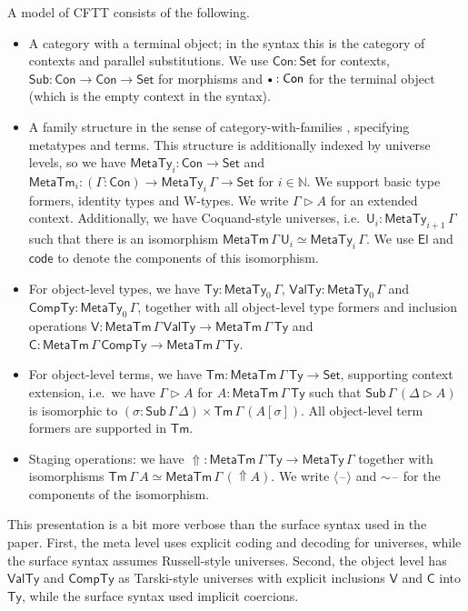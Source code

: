 \documentclass[acmsmall]{acmart}
\newcommand{\msf}[1]{{\mathsf{#1}}}
\newcommand{\mbb}[1]{\mathbb{#1}}
\newcommand{\U}{\mathsf{U}}
\newcommand{\code}{\mathsf{code}}
\newcommand{\bs}[1]{\boldsymbol{#1}}
\newcommand{\emptycon}{\scaleobj{.75}\bullet}
\newcommand{\El}{\msf{El}}
\newcommand{\Set}{\msf{Set}}
\newcommand{\Con}{\msf{Con}}
\newcommand{\Sub}{\msf{Sub}}
\newcommand{\Tm}{\msf{Tm}}
\newcommand{\ext}{\triangleright}
\newcommand{\Lift}{{\Uparrow}}
\newcommand{\spl}{{\bs{\sim}}}
\newcommand{\ql}{{\bs{\langle}}}
\newcommand{\qr}{{\bs{\rangle}}}
\newcommand{\MTy}{\msf{MetaTy}}
\newcommand{\MTm}{\msf{MetaTm}}
\newcommand{\VTy}{\msf{ValTy}}
\newcommand{\Ty}{\msf{Ty}}
\newcommand{\CTy}{\msf{CompTy}}
\newcommand{\blank}{{\mathord{\hspace{1pt}\text{--}\hspace{1pt}}}}
\theoremstyle{remark}
\begin{document}
\begin{definition}[] A model of CFTT consists of the following.

\begin{itemize}
\item A category with a terminal object; in the syntax this is the category
  of contexts and parallel substitutions. We use $\Con : \Set$ for contexts,
  $\Sub : \Con \to \Con \to \Set$ for morphisms and $\emptycon : \Con$ for the
  terminal object (which is the empty context in the syntax).
\item A family structure in the sense of category-with-families \cite{Dybjer96internaltype},
  specifying metatypes and terms. This structure is additionally indexed by
  universe levels, so we have $\MTy_i : \Con \to \Set$ and $\msf{MetaTm}_i :
  (\Gamma : \Con) \to \MTy_i\,\Gamma \to \Set$ for $i \in \mbb{N}$. We support
  basic type formers, identity types and W-types. We write $\Gamma \ext A$ for
  an extended context. Additionally, we have Coquand-style universes,
  i.e.\ $\U_i : \MTy_{i+1}\,\Gamma$ such that there is an isomorphism
  $\msf{MetaTm}\,\Gamma\,\U_i \simeq \MTy_i\,\Gamma$.  We use $\El$ and
  $\code$ to denote the components of this isomorphism.
\item
  For object-level types, we have $\Ty : \MTy_0\,\Gamma$, $\VTy :
  \MTy_0\,\Gamma$ and $\CTy : \MTy_0\,\Gamma$, together with all object-level
  type formers and inclusion operations $\msf{V} : \MTm\,\Gamma\,\VTy \to \MTm\,\Gamma\,\Ty$
  and $\msf{C} : \MTm\,\Gamma\,\CTy \to \MTm\,\Gamma\,\Ty$.
\item For object-level terms, we have $\Tm : \MTm\,\Gamma\,\Ty \to \Set$,
  supporting context extension, i.e.\ we have $\Gamma\ext A$ for
  $A : \MTm\,\Gamma\,\Ty$ such that $\Sub\,\Gamma\,(\Delta\ext A)$ is isomorphic
  to $(\sigma : \Sub\,\Gamma\,\Delta) \times \Tm\,\Gamma\,(A[\sigma])$. All
  object-level term formers are supported in $\Tm$.
\item Staging operations: we have $\Lift : \MTm\,\Gamma\,\Ty \to \MTy\,\Gamma$ together
  with isomorphisms $\Tm\,\Gamma\,A \simeq \MTm\,\Gamma\,(\Lift A)$.
  We write $\ql\!\blank\!\qr$ and $\spl\!\blank$ for the components of the isomorphism.
\end{itemize}
\end{definition}
This presentation is a bit more verbose than the surface syntax used in the
paper. First, the meta level uses explicit coding and decoding for universes,
while the surface syntax assumes Russell-style universes. Second, the object
level has $\VTy$ and $\CTy$ as Tarski-style universes with explicit inclusions
$\msf{V}$ and $\msf{C}$ into $\Ty$, while the surface syntax used implicit
coercions.
\end{document}
